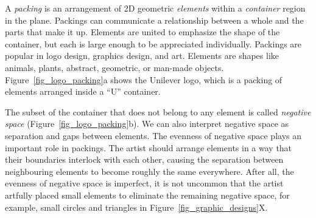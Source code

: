 



A \textit{packing} is an arrangement of 2D geometric
\textit{elements} within a \textit{container} region in the plane.
Packings can communicate a relationship between a whole and the parts that make it up.
Elements are united to emphasize the shape of the container,
but each is large enough to be appreciated individually.
Packings are popular in logo design, graphics design, and art.
Elements are shapes like animals, plants, abstract, geometric, or man-made objects.
Figure~\ref{fig_logo_packing}a shows the Unilever logo,
which is a packing of elements arranged inside a ``U'' container.

The subset of the container that does not belong to any element is
called \textit{negative space} (Figure~\ref{fig_logo_packing}b).
We can also interpret negative space as separation and gaps between elements.
The evenness of negative space plays an important role in  packings.  
The artist should arrange elements in a way that their boundaries interlock with each other,
causing the separation between neighbouring elements to become roughly the same everywhere.
After all, the evenness of negative space is imperfect, it is not uncommon that 
the artist artfully placed small elements to eliminate the remaining negative space,
for example, small circles and triangles in Figure~\ref{fig_graphic_designs}X.


